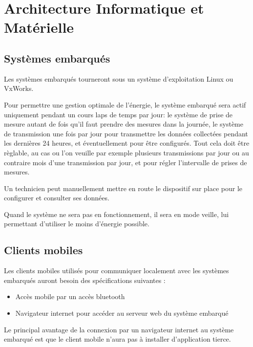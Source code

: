 \section{Architecture Informatique et Matérielle}

\subsection{Systèmes embarqués}

Les systèmes embarqués tourneront sous un système d'exploitation Linux ou VxWorks. 

Pour permettre une gestion optimale de l'énergie, le système embarqué sera actif
uniquement pendant un cours laps de temps par jour: le système de prise de mesure
autant de fois qu'il faut prendre des mesures dans la journée, le système de
transmission une fois par jour pour transmettre les données collectées pendant
les dernières 24 heures, et éventuellement pour être configurés.
Tout cela doit être règlable, au cas ou l'on veuille par exemple plusieurs transmissions
par jour ou au contraire mois d'une transmission par jour, et pour régler l'intervalle de
prises de mesures.

Un technicien peut manuellement mettre en route le dispositif sur place pour
le configurer et consulter ses données.

Quand le système ne sera pas en fonctionnement, il sera en mode veille, lui
permettant d'utiliser le moins d'énergie possible.



\subsection{Clients mobiles}

Les clients mobiles utilisés pour communiquer localement avec les systèmes embarqués auront besoin des spécifications suivantes : 
\begin{itemize}
\item Accès mobile par un accès bluetooth
\item Navigateur internet pour accéder au serveur web du système embarqué
\end{itemize}
Le principal avantage de la connexion par un navigateur internet au système 
embarqué est que le client mobile n'aura pas à installer d'application tierce.

